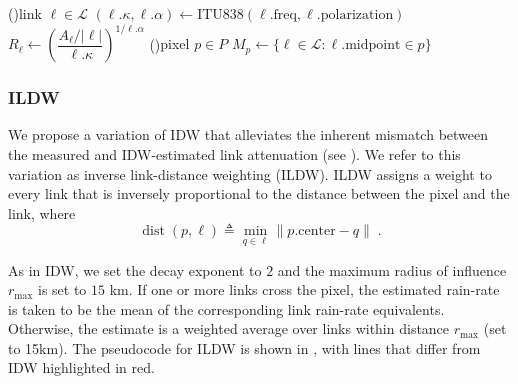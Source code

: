 \documentclass[a4paper,fleqn]{cas-sc}
\begin{document}
\begin{algorithm}[H]
  \caption{Discretized IDW. Each link is replaced with a virtual gauge located at the midpoint of the link. The rain-rate at the gauge is set to the rain-rate equivalent of its link. IDW is then applied with respect to these virtual gauges. We set the exponent of the decay to $2$. }
  \label{alg:idw}
  \DontPrintSemicolon
  \ForEach(){link $\ell \in \mathcal{L}$}{%
    $(\ell.\kappa,\ell.\alpha) \gets \mathrm{ITU838}(\ell.\mathrm{freq},\ell.\mathrm{polarization})$\;
    $R_\ell\gets \left(\dfrac{A_\ell/|\ell|}{\ell.\kappa}\right)^{1/\ell.\alpha}$\;
  }
  \ForEach(){pixel $p \in {P}$}{
    $M_p \gets \{\ell \in \mathcal{L} : \ell.\mathrm{midpoint} \in p\}$\;
  }
\end{algorithm}


\subsubsection{ILDW}
We propose a variation of IDW that alleviates the inherent mismatch between the measured and IDW-estimated link attenuation (see ).
We refer to this variation as inverse link-distance weighting (ILDW).
ILDW assigns a weight to every link that is inversely proportional to the distance between the pixel and the link, where
\[
  \operatorname{dist}(p,\ell) \triangleq \min_{q\in \ell} \|p.\textrm{center}-q\|\;.
\]

As in IDW, we set the decay exponent to $2$ and the maximum radius of influence $r_{\max}$ is set to $15$ \si{\kilo\meter}.
If one or more links cross the pixel, the estimated rain-rate is taken to be the mean of the corresponding link rain-rate equivalents. Otherwise, the estimate is a weighted average over links within distance $r_{\max}$ (set to 15km). The pseudocode for ILDW is shown in , with lines that differ from IDW highlighted in red.
\end{document}
